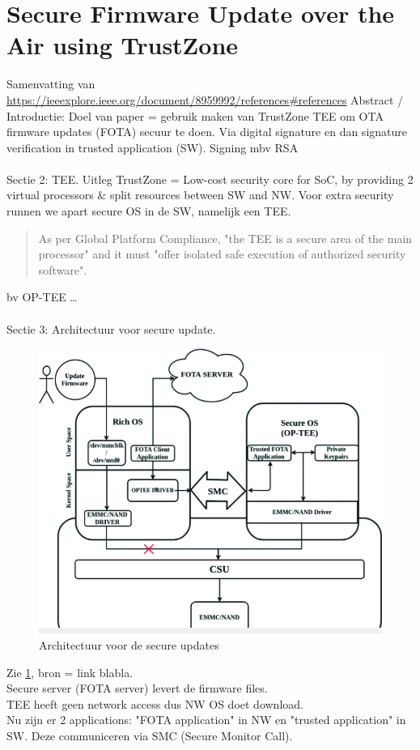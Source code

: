 \section{Secure Firmware Update over the Air using TrustZone}
Samenvatting van \url{https://ieeexplore.ieee.org/document/8959992/references#references}
Abstract / Introductie: Doel van paper = gebruik maken van TrustZone TEE om OTA firmware updates (FOTA) secuur te doen. Via digital signature en dan signature verification in trusted application (SW). Signing mbv RSA\\
\\
Sectie 2: TEE. Uitleg TrustZone = Low-cost security core for SoC, by providing 2 virtual processors \& split resources between SW and NW.
Voor extra security runnen we apart secure OS in de SW, namelijk een TEE.
\begin{quote}
    As per Global Platform Compliance, "the TEE is a secure area of the main processor" and it must "offer isolated safe execution of authorized security software".
\end{quote}
bv OP-TEE \dots
\\
\\
Sectie 3: Architectuur voor secure update.
\begin{figure}
    \centering
    \includegraphics[width=0.5\linewidth]{figures/Architectuur secure updates.png}
    \caption{Architectuur voor de secure updates}
    \label{fig:secureUpdateArchitecture}
\end{figure}
Zie \ref{fig:secureUpdateArchitecture}, bron = link blabla.\\
Secure server (FOTA server) levert de firmware files.\\
TEE heeft geen network access dus NW OS doet download.\\
Nu zijn er 2 applications: "FOTA application" in NW en "trusted application" in SW. Deze communiceren via SMC (Secure Monitor Call).\\
\\
